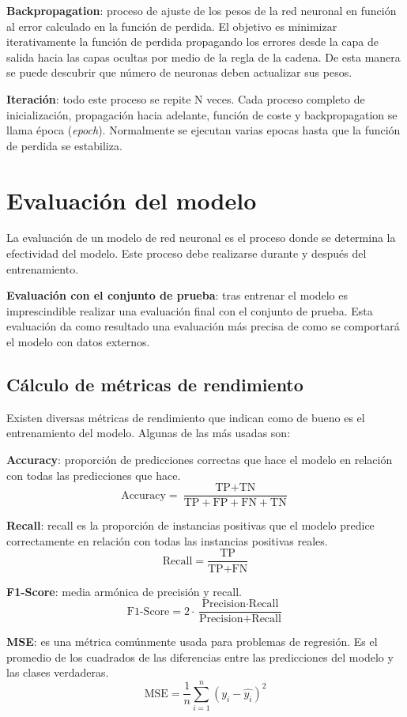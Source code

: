 \textbf{Backpropagation}: proceso de ajuste de los pesos de la red neuronal en función al error calculado en la función de perdida. El objetivo es minimizar iterativamente la función de perdida propagando los errores desde la capa de salida hacia las capas ocultas por medio de la regla de la cadena. De esta manera se puede descubrir que número de neuronas deben actualizar sus pesos.

\textbf{Iteración}: todo este proceso se repite N veces. Cada proceso completo de inicialización, propagación hacia adelante, función de coste y backpropagation se llama época (\textit{epoch}). Normalmente se ejecutan varias epocas hasta que la función de perdida se estabiliza.

\section{Evaluación del modelo}
La evaluación de un modelo de red neuronal es el proceso donde se determina la efectividad del modelo. Este proceso debe realizarse durante y después del entrenamiento.

\textbf{Evaluación con el conjunto de prueba}: tras entrenar el modelo es imprescindible realizar una evaluación final con el conjunto de prueba. Esta evaluación da como resultado una evaluación más precisa de como se comportará el modelo con datos externos.

\subsection{Cálculo de métricas de rendimiento}
Existen diversas métricas de rendimiento que indican como de bueno es el entrenamiento del modelo. Algunas de las más usadas son:

\textbf{Accuracy}: proporción de predicciones correctas que hace el modelo en relación con todas las predicciones que hace.
\begin{equation}
\text{Accuracy} = \frac{\text{TP} + \text{TN}}{\text{TP} + \text{FP} + \text{FN} + \text{TN}}
\end{equation}

\textbf{Recall}: recall es la proporción de instancias positivas que el modelo predice correctamente en relación con todas las instancias positivas reales.
\begin{equation}
\text{Recall} = \frac{\text{TP}}{\text{TP} + \text{FN}}
\end{equation}

\textbf{F1-Score}: media armónica de precisión y recall.
\begin{equation}
\text{F1-Score} = 2 \cdot \frac{\text{Precision} \cdot \text{Recall}}{\text{Precision} + \text{Recall}}
\end{equation}

\textbf{MSE}: es una métrica comúnmente usada para problemas de regresión. Es el promedio de los cuadrados de las diferencias entre las predicciones del modelo y las clases verdaderas.
\begin{equation}
\text{MSE} = \frac{1}{n} \sum_{i=1}^{n} (y_i - \hat{y_i})^2
\end{equation}
